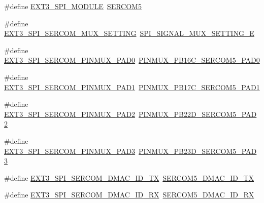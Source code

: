 \begin{DoxyCompactItemize}
\item 
\#define \mbox{\hyperlink{group__samd21__xplained__pro__features__group_gabc0417beba6a839dc92dc896b683bdc9}{E\+X\+T3\+\_\+\+S\+P\+I\+\_\+\+M\+O\+D\+U\+LE}}~\mbox{\hyperlink{group___s_a_m_d21_j18_a__base_ga8785a316e608cb0a218f2a59655d6037}{S\+E\+R\+C\+O\+M5}}
\item 
\#define \mbox{\hyperlink{group__samd21__xplained__pro__features__group_ga8d4d30895d2d69a41519f7bd6186fa42}{E\+X\+T3\+\_\+\+S\+P\+I\+\_\+\+S\+E\+R\+C\+O\+M\+\_\+\+M\+U\+X\+\_\+\+S\+E\+T\+T\+I\+NG}}~\mbox{\hyperlink{group__asfdoc__sam0__sercom__spi__group_gga420e19efe4a923eb9ab6dc619a23c370a7234b3f4e0aa7fe723cc85edabea9816}{S\+P\+I\+\_\+\+S\+I\+G\+N\+A\+L\+\_\+\+M\+U\+X\+\_\+\+S\+E\+T\+T\+I\+N\+G\+\_\+E}}
\item 
\#define \mbox{\hyperlink{group__samd21__xplained__pro__features__group_gad84ea44cf2afd41b5ba4fb60de91eb09}{E\+X\+T3\+\_\+\+S\+P\+I\+\_\+\+S\+E\+R\+C\+O\+M\+\_\+\+P\+I\+N\+M\+U\+X\+\_\+\+P\+A\+D0}}~\mbox{\hyperlink{pio_2samd21j18a_8h_aeae967081710a10f32df07c0c02b3d7b}{P\+I\+N\+M\+U\+X\+\_\+\+P\+B16\+C\+\_\+\+S\+E\+R\+C\+O\+M5\+\_\+\+P\+A\+D0}}
\item 
\#define \mbox{\hyperlink{group__samd21__xplained__pro__features__group_gae4cdf177fe002739bf0c0eb28ee02f7b}{E\+X\+T3\+\_\+\+S\+P\+I\+\_\+\+S\+E\+R\+C\+O\+M\+\_\+\+P\+I\+N\+M\+U\+X\+\_\+\+P\+A\+D1}}~\mbox{\hyperlink{pio_2samd21j18a_8h_a52d21c6ab3b1e29a665171528f5fd287}{P\+I\+N\+M\+U\+X\+\_\+\+P\+B17\+C\+\_\+\+S\+E\+R\+C\+O\+M5\+\_\+\+P\+A\+D1}}
\item 
\#define \mbox{\hyperlink{group__samd21__xplained__pro__features__group_ga725cf7f9cbc5231e0bdbda235551d782}{E\+X\+T3\+\_\+\+S\+P\+I\+\_\+\+S\+E\+R\+C\+O\+M\+\_\+\+P\+I\+N\+M\+U\+X\+\_\+\+P\+A\+D2}}~\mbox{\hyperlink{pio_2samd21j18a_8h_a50be2bec24a1ecdce31937a77ab5d09f}{P\+I\+N\+M\+U\+X\+\_\+\+P\+B22\+D\+\_\+\+S\+E\+R\+C\+O\+M5\+\_\+\+P\+A\+D2}}
\item 
\#define \mbox{\hyperlink{group__samd21__xplained__pro__features__group_ga84f1a1f8499cfa151898410c2dcf388c}{E\+X\+T3\+\_\+\+S\+P\+I\+\_\+\+S\+E\+R\+C\+O\+M\+\_\+\+P\+I\+N\+M\+U\+X\+\_\+\+P\+A\+D3}}~\mbox{\hyperlink{pio_2samd21j18a_8h_a55272a225c5d8830c891785a6e06c3f4}{P\+I\+N\+M\+U\+X\+\_\+\+P\+B23\+D\+\_\+\+S\+E\+R\+C\+O\+M5\+\_\+\+P\+A\+D3}}
\item 
\#define \mbox{\hyperlink{group__samd21__xplained__pro__features__group_ga79fe256857e45d2a7cafbc66997cae98}{E\+X\+T3\+\_\+\+S\+P\+I\+\_\+\+S\+E\+R\+C\+O\+M\+\_\+\+D\+M\+A\+C\+\_\+\+I\+D\+\_\+\+TX}}~\mbox{\hyperlink{sercom5_8h_a9c1d161a2cff0b7ecf94033780200841}{S\+E\+R\+C\+O\+M5\+\_\+\+D\+M\+A\+C\+\_\+\+I\+D\+\_\+\+TX}}
\item 
\#define \mbox{\hyperlink{group__samd21__xplained__pro__features__group_ga3f1449f5a3664f6d79cc87bec6b19363}{E\+X\+T3\+\_\+\+S\+P\+I\+\_\+\+S\+E\+R\+C\+O\+M\+\_\+\+D\+M\+A\+C\+\_\+\+I\+D\+\_\+\+RX}}~\mbox{\hyperlink{sercom5_8h_a24944592fdfc7c0821841f8de96c30b0}{S\+E\+R\+C\+O\+M5\+\_\+\+D\+M\+A\+C\+\_\+\+I\+D\+\_\+\+RX}}
\end{DoxyCompactItemize}
